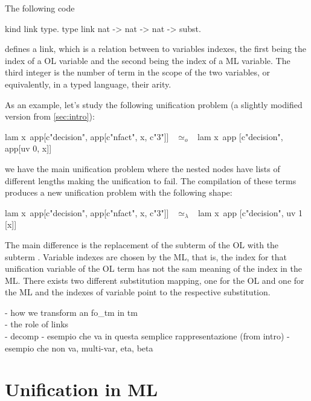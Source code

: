 \documentclass[sigconf,natbib=false]{acmart}
\newcommand{\UnifRel}{\ensuremath{\simeq}}
\newcommand{\Uo}{\ensuremath{\UnifRel_o}\xspace}
\newcommand{\Ue}{\ensuremath{\UnifRel_\lambda}\xspace}
\begin{document}
The following code
%
\begin{elpicode}
  kind link type.
  type link nat -> nat -> nat -> subst.
\end{elpicode}
%
\noindent
defines a link, which is a relation between to variables indexes, the first
being the index of a OL variable and the second being the index of a ML
variable. The third integer is the number of term in the
scope of the two variables, or equivalently, in a typed language, their arity. 

As an example, let's study the following unification problem (a slightly 
modified version from \cref{sec:intro}):

\begin{elpicode}
  lam x\ app[c"decision", app[c"nfact", x, c"3"]] ~\Uo~
    lam x\ app [c"decision", app[uv 0, x]]
\end{elpicode}

\noindent
we have the main unification problem where the nested  nodes have
lists of different lengths making the unification to fail. The compilation of 
these terms produces a new unification problem with the following shape:

\begin{elpicode}
  lam x\ app[c"decision", app[c"nfact", x, c"3"]] ~\Ue~ 
    lam x\ app [c"decision", uv 1 [x]]
\end{elpicode}

\noindent
The main difference is the replacement of the subterm  of
the OL with the subterm . Variable indexes are chosen by the
ML, that is, the index  for that unification variable of the OL term
has not the sam meaning of the index  in the ML. There exists two
different substitution mapping, one for the OL and one for the ML and the indexes
of variable point to the respective substitution.

\noindent
- how we transform an fo\_tm in tm \\
- the role of links \\
- decomp
- esempio che va in questa semplice rappresentazione (from intro)
- esempio che non va, multi-var, eta, beta

\section{Unification in ML}
\end{document}

